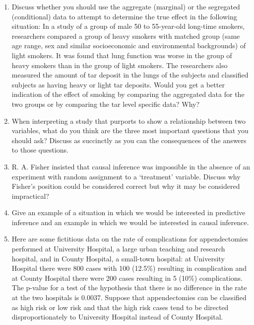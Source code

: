 \documentclass[
]{article}
\begin{document}
\begin{enumerate}
\item
  Discuss whether you should use the aggregate (marginal) or the
  segregated (conditional) data to attempt to determine the true effect
  in the following situation: In a study of a group of male 50 to
  55-year-old long-time smokers, researchers compared a group of heavy
  smokers with matched group (same age range, sex and similar
  socioeconomic and environmental backgrounds) of light smokers. It was
  found that lung function was worse in the group of heavy smokers than
  in the group of light smokers. The researchers also measured the
  amount of tar deposit in the lungs of the subjects and classified
  subjects as having heavy or light tar deposits. Would you get a better
  indication of the effect of smoking by comparing the aggregated data
  for the two groups or by comparing the tar level specific data? Why?
  \vspace{0px}
\item
  When interpreting a study that purports to show a relationship between
  two variables, what do you think are the three most important
  questions that you should ask? Discuss as succinctly as you can the
  consequences of the answers to those questions. \vspace{0px}
\item
  R. A. Fisher insisted that causal inference was impossible in the
  absence of an experiment with random assignment to a `treatment'
  variable. Discuss why Fisher's position could be considered correct
  but why it may be considered impractical? \vspace{0px}
\item
  Give an example of a situation in which we would be interested in
  predictive inference and an example in which we would be interested in
  causal inference. \vspace{0px}
\item
  Here are some fictitious data on the rate of complications for
  appendectomies performed at University Hospital, a large urban
  teaching and research hospital, and in County Hospital, a small-town
  hospital: at University Hospital there were 800 cases with 100
  (12.5\%) resulting in complication and at County Hospital there were
  200 cases resulting in 5 (10\%) complications. The p-value for a test
  of the hypothesis that there is no difference in the rate at the two
  hospitals is 0.0037. Suppose that appendectomies can be classified as
  high risk or low risk and that the high risk cases tend to be directed
  disproportionately to University Hospital instead of County Hospital.

\end{enumerate}
\end{document}
